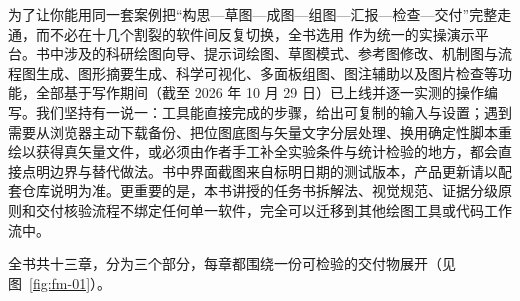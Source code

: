 为了让你能用同一套案例把“构思—草图—成图—组图—汇报—检查—交付”完整走通，而不必在十几个割裂的软件间反复切换，全书选用 \scidraw{} 作为统一的实操演示平台。书中涉及的科研绘图向导、提示词绘图、草图模式、参考图修改、机制图与流程图生成、图形摘要生成、科学可视化、多面板组图、图注辅助以及图片检查等功能，全部基于写作期间（截至 2026 年 10 月 29 日）已上线并逐一实测的操作编写。我们坚持有一说一：工具能直接完成的步骤，给出可复制的输入与设置；遇到需要从浏览器主动下载备份、把位图底图与矢量文字分层处理、换用确定性脚本重绘以获得真矢量文件，或必须由作者手工补全实验条件与统计检验的地方，都会直接点明边界与替代做法。书中界面截图来自标明日期的测试版本，产品更新请以配套仓库说明为准。更重要的是，本书讲授的任务书拆解法、视觉规范、证据分级原则和交付核验流程不绑定任何单一软件，完全可以迁移到其他绘图工具或代码工作流中。

全书共十三章，分为三个部分，每章都围绕一份可检验的交付物展开（见图~\ref{fig:fm-01}）。

